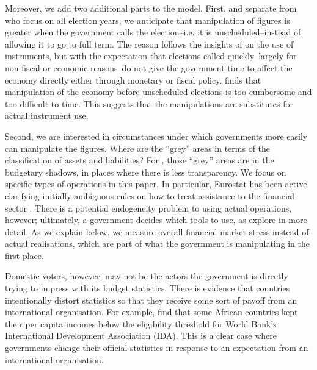 \documentclass[]{article}
\begin{document}
Moreover, we add two additional parts to the model. First, and separate from \cite{Alt2014} who focus on all election years, we anticipate that manipulation of figures is greater when the government calls the election--i.e. it is unscheduled--instead of allowing it to go to full term. The reason follows the insights of \cite{clark2003} on the use of instruments, but with the expectation that elections called quickly--largely for non-fiscal or economic reasons--do not give the government time to affect the economy directly either through monetary or fiscal policy. \cite{Kayser2005} finds that manipulation of the economy before unscheduled elections is too cumbersome and too difficult to time. This suggests that the manipulations are substitutes for actual instrument use.

Second, we are interested in circumstances under which governments more easily can manipulate the figures. Where are the ``grey'' areas in terms of the classification of assets and liabilities? For \cite{Alt2014}, those ``grey'' areas are in the budgetary shadows, in places where there is less transparency. We focus on specific types of operations in this paper. In particular, Eurostat has been active clarifying initially ambiguous rules on how to treat assistance to the financial sector \cite[see][]{GandrudHallerberg2016}. There is a potential endogeneity problem to using actual operations, however; ultimately, a government decides which tools to use, as \cite{GandrudHallerberg2016} explore in more detail. As we explain below, we measure overall financial market stress instead of actual realisations, which are part of what the government is manipulating in the first place.

Domestic voters, however, may not be the actors the government is directly trying to impress with its budget statistics. There is evidence that countries intentionally distort statistics so that they receive some sort of payoff from an international organisation. For example, \cite{kerner2016} find that some African countries kept their per capita incomes below the eligibility threshold for World Bank’s International Development Association (IDA). This is a clear case where governments change their official statistics in response to an expectation from an international organisation.
\end{document}
